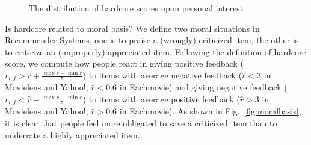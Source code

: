 \documentclass{sig-alternate}
\begin{document}
\begin{figure}[htbp]
\centering
\centering
{}
\caption{The distribution of hardcore scores upon personal interest}
\label{fig:personalinterest}
\end{figure}

Is hardcore related to moral basis? We define two moral situations in Recommender Systems, one is to praise a (wrongly) criticized item, the other is to criticize an (improperly) appreciated item. Following the definition of hardcore score, we compute how people react in giving positive feedback ($r_{i,j}>\hat{r}+\frac{\max{r}-\min{r}}{5}$) to items with average negative feedback ($\hat{r}<3$ in Movielens and Yahoo!, $\hat{r}<0.6$ in Eachmovie) and giving negative feedback ($r_{i,j}<\hat{r}-\frac{\max{r}-\min{r}}{5}$) to items with average positive feedback ($\hat{r}>3$ in Movielens and Yahoo!, $\hat{r}>0.6$ in Eachmovie). As shown in Fig.~\ref{fig:moralbasis}, it is clear that people feel more obligated to save a criticized item than to underrate a highly appreciated item.
\end{document}
